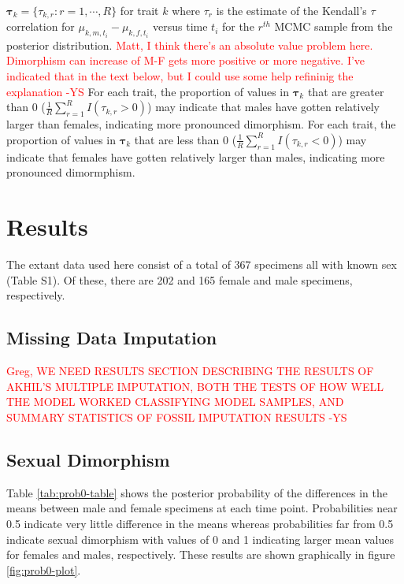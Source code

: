 \documentclass[
  12pt,
]{article}
\begin{document}
\(\boldsymbol{\tau}_k = \{\tau_{k,r}: r = 1,\cdots,R\}\) for trait \(k\)
where \(\tau_r\) is the estimate of the Kendall's \(\tau\) correlation
for \(\mu_{k,m,t_i} - \mu_{k,f,t_i}\) versus time \(t_i\) for the
\(r^{th}\) MCMC sample from the posterior distribution.
\textcolor{red}{Matt, I think there's an absolute value problem here. Dimorphism can increase of M-F gets more positive or more negative. I've indicated that in the text below, but I could use some help refininig the explanation -YS}
For each trait, the proportion of values in \(\boldsymbol{\tau}_k\) that
are greater than 0 (\(\frac{1}{R} \sum_{r=1}^R I(\tau_{k,r} > 0)\)) may
indicate that males have gotten relatively larger than females,
indicating more pronounced dimorphism. For each trait, the proportion of
values in \(\boldsymbol{\tau}_k\) that are less than 0
(\(\frac{1}{R} \sum_{r=1}^R I(\tau_{k,r} < 0)\)) may indicate that
females have gotten relatively larger than males, indicating more
pronounced dimormphism.

\hypertarget{sec:results}{%
\section{Results}\label{sec:results}}

The extant data used here consist of a total of 367 specimens all with
known sex (Table S1). Of these, there are 202 and 165 female and male
specimens, respectively.

\hypertarget{missing-data-imputation}{%
\subsection{Missing Data Imputation}\label{missing-data-imputation}}

\textcolor{red}{Greg, WE NEED RESULTS SECTION DESCRIBING THE RESULTS OF AKHIL'S MULTIPLE IMPUTATION, BOTH THE TESTS OF HOW WELL THE MODEL WORKED CLASSIFYING MODEL SAMPLES, AND SUMMARY STATISTICS OF FOSSIL IMPUTATION RESULTS -YS}

\hypertarget{sexual-dimorphism}{%
\subsection{Sexual Dimorphism}\label{sexual-dimorphism}}

Table \ref{tab:prob0-table} shows the posterior probability of the
differences in the means between male and female specimens at each time
point. Probabilities near 0.5 indicate very little difference in the
means whereas probabilities far from 0.5 indicate sexual dimorphism with
values of 0 and 1 indicating larger mean values for females and males,
respectively. These results are shown graphically in figure
\ref{fig:prob0-plot}.
\end{document}
